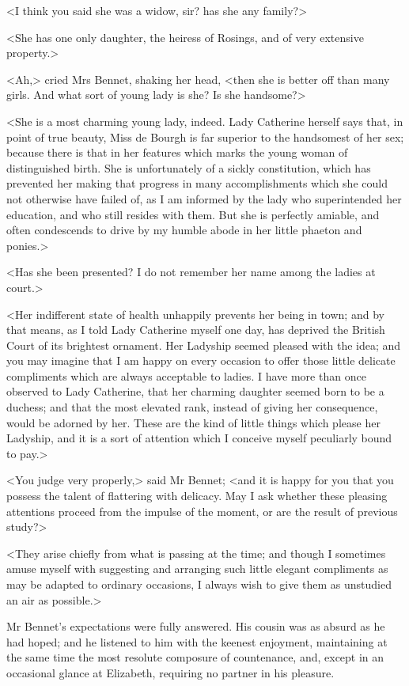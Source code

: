 <I think you said she was a widow, sir? has she any family?>

<She has one only daughter, the heiress of Rosings, and of very extensive property.>

<Ah,> cried Mrs Bennet, shaking her head, <then she is better off than many girls. And what sort of young lady is she? Is she handsome?>

<She is a most charming young lady, indeed. Lady Catherine herself says that, in point of true beauty, Miss de Bourgh is far superior to the handsomest of her sex; because there is that in her features which marks the young woman of distinguished birth. She is unfortunately of a sickly constitution, which has prevented her making that progress in many accomplishments which she could not otherwise have failed of, as I am informed by the lady who superintended her education, and who still resides with them. But she is perfectly amiable, and often condescends to drive by my humble abode in her little phaeton and ponies.>

<Has she been presented? I do not remember her name among the ladies at court.>

<Her indifferent state of health unhappily prevents her being in town; and by that means, as I told Lady Catherine myself one day, has deprived the British Court of its brightest ornament. Her Ladyship seemed pleased with the idea; and you may imagine that I am happy on every occasion to offer those little delicate compliments which are always acceptable to ladies. I have more than once observed to Lady Catherine, that her charming daughter seemed born to be a duchess; and that the most elevated rank, instead of giving her consequence, would be adorned by her. These are the kind of little things which please her Ladyship, and it is a sort of attention which I conceive myself peculiarly bound to pay.>

<You judge very properly,> said Mr Bennet; <and it is happy for you that you possess the talent of flattering with delicacy. May I ask whether these pleasing attentions proceed from the impulse of the moment, or are the result of previous study?>

<They arise chiefly from what is passing at the time; and though I sometimes amuse myself with suggesting and arranging such little elegant compliments as may be adapted to ordinary occasions, I always wish to give them as unstudied an air as possible.>

Mr Bennet's expectations were fully answered. His cousin was as absurd as he had hoped; and he listened to him with the keenest enjoyment, maintaining at the same time the most resolute composure of countenance, and, except in an occasional glance at Elizabeth, requiring no partner in his pleasure.

